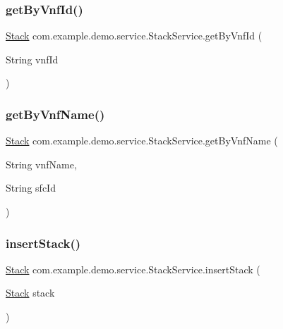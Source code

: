 \subsubsection{\texorpdfstring{get\+By\+Vnf\+Id()}{getByVnfId()}}
{\footnotesize\ttfamily \mbox{\hyperlink{classcom_1_1example_1_1demo_1_1modular_1_1_stack}{Stack}} com.\+example.\+demo.\+service.\+Stack\+Service.\+get\+By\+Vnf\+Id (\begin{DoxyParamCaption}\item[{String}]{vnf\+Id }\end{DoxyParamCaption})}

\mbox{\label{classcom_1_1example_1_1demo_1_1service_1_1_stack_service_ae8d285d2c823fd82bdaf9d33b2bb2f10}} 
\subsubsection{\texorpdfstring{get\+By\+Vnf\+Name()}{getByVnfName()}}
{\footnotesize\ttfamily \mbox{\hyperlink{classcom_1_1example_1_1demo_1_1modular_1_1_stack}{Stack}} com.\+example.\+demo.\+service.\+Stack\+Service.\+get\+By\+Vnf\+Name (\begin{DoxyParamCaption}\item[{String}]{vnf\+Name,  }\item[{String}]{sfc\+Id }\end{DoxyParamCaption})}

\mbox{\label{classcom_1_1example_1_1demo_1_1service_1_1_stack_service_ab4ee52412332a907d899951c21c87763}} 
\subsubsection{\texorpdfstring{insert\+Stack()}{insertStack()}}
{\footnotesize\ttfamily \mbox{\hyperlink{classcom_1_1example_1_1demo_1_1modular_1_1_stack}{Stack}} com.\+example.\+demo.\+service.\+Stack\+Service.\+insert\+Stack (\begin{DoxyParamCaption}\item[{\mbox{\hyperlink{classcom_1_1example_1_1demo_1_1modular_1_1_stack}{Stack}}}]{stack }\end{DoxyParamCaption})}

